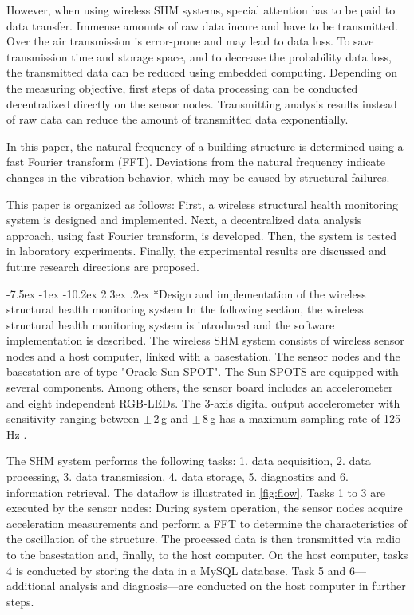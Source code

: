 \documentclass[12pt,a4paper]{scrartcl}
\makeatletter
\renewcommand\section{\@startsection{section}{1}{\z@}%
                     {-7.5ex \@plus -1ex \@minus -10.2ex}%
                     {2.3ex \@plus.2ex}%
                     {\sffamily\large\bfseries}}
\makeatother
\begin{document}
However, when using wireless SHM systems, special attention has to be paid to data transfer.
Immense amounts of raw data incure and have to be transmitted.
Over the air transmission is error-prone and may lead to data loss.
To save transmission time and storage space, and to decrease the probability data loss, the transmitted data can be reduced using embedded computing.
Depending on the measuring objective, first steps of data processing can be conducted decentralized directly on the sensor nodes.
Transmitting analysis results instead of raw data can reduce the amount of transmitted data exponentially.

In this paper, the natural frequency of a building structure is determined using a fast Fourier transform (FFT).
Deviations from the natural frequency indicate changes in the vibration behavior, which may be caused by structural failures.

This paper is organized as follows:
First, a wireless structural health monitoring system is designed and implemented. 
Next, a decentralized data analysis approach, using fast Fourier transform, is developed.
Then, the system is tested in laboratory experiments.
Finally, the experimental results are discussed and future research directions are proposed.


\section*{Design and implementation of the wireless structural health monitoring system}
In the following section, the wireless structural health monitoring system is introduced and the software implementation is described.
The wireless SHM system consists of wireless sensor nodes and a host computer, linked with a basestation.
The sensor nodes and the basestation are of type "Oracle Sun SPOT". 
The Sun SPOTS are equipped with several components.
Among others, the sensor board includes an accelerometer and eight independent RGB-LEDs.
The 3-axis digital output accelerometer with sensitivity ranging between $\pm$\,2\,g and $\pm$\,8\,g has a maximum sampling rate of 125\,Hz \citep{eDemo2010}.

The SHM system performs the following tasks:
1. data acquisition,
2. data processing,
3. data transmission, 
4. data storage,
5. diagnostics and 
6. information retrieval.
The dataflow is illustrated in \autoref{fig:flow}.
Tasks 1 to 3 are executed by the sensor nodes: During system operation, the sensor nodes acquire acceleration measurements and perform a FFT to determine the characteristics of the oscillation of the structure. 
The processed data is then transmitted via radio to the basestation and, finally, to the host computer.
On the host computer, tasks 4 is conducted by storing the data in a MySQL database.
Task 5 and 6---additional analysis and diagnosis---are conducted on the host computer in further steps.
\end{document}
